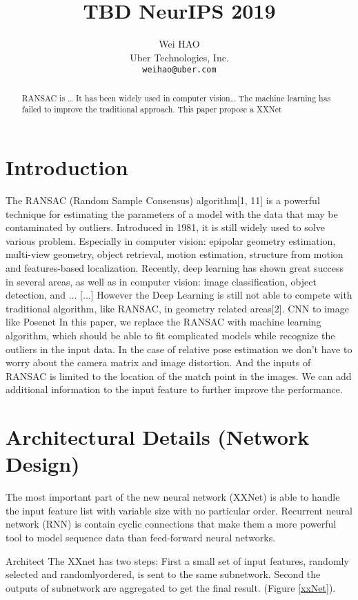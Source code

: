 \documentclass{article}
\title{TBD NeurIPS 2019}
\author{%
  Wei HAO \\
  Uber Technologies, Inc. \\
  \texttt{weihao@uber.com} \\
}
\begin{document}

\maketitle

\begin{abstract}
RANSAC is …
It has been widely used in computer vision…
The machine learning has failed to improve the traditional approach.
This paper propose a XXNet

\end{abstract}

\section{Introduction}
The RANSAC (Random Sample Consensus) algorithm[1, 11] is a powerful technique for estimating the parameters of a model with the data that may be contaminated by outliers. Introduced in 1981, it is still widely used to solve various problem. Especially in computer vision: epipolar geometry estimation, multi-view geometry, object retrieval, motion estimation, structure from motion and features-based localization.
Recently, deep learning has shown great success in several areas, as well as in computer vision: image classification, object detection, and ... [...]
However the Deep Learning is still not able to compete with traditional algorithm, like RANSAC, in geometry related areas[2]. CNN to image like Posenet
In this paper, we replace the RANSAC with machine learning algorithm, which should be able to fit complicated models while recognize the outliers in the input data. In the case of relative pose estimation we don’t have to worry about the camera matrix and image distortion. And the inputs of RANSAC is limited to the location of the match point in the images. We can add additional information to the input feature to further improve the performance. 

\section{Architectural Details (Network Design)}
The most important part of the new neural network (XXNet) is able to handle the input feature list with variable size with no particular order. Recurrent neural network (RNN) is contain cyclic connections that make them a more powerful tool to model sequence data than feed-forward neural networks.

Architect
The XXnet has two steps: First a small set of input features, randomly selected and randomlyordered, is sent to the same subnetwork. Second the outputs of subnetwork are aggregated to get the final result. (Figure \ref{xxNet}).
\end{document}
